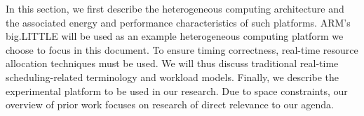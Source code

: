 In this section, we first describe the heterogeneous computing architecture and the associated energy and performance characteristics of such platforms. ARM's big.LITTLE will be used as an example heterogeneous computing platform we choose to focus in this document. To ensure timing correctness, real-time resource allocation techniques must be used. We will thus discuss traditional real-time scheduling-related terminology and workload models. Finally, we describe the experimental platform to be used in our research. Due to space constraints, our overview of prior work focuses on research of direct relevance to our agenda.